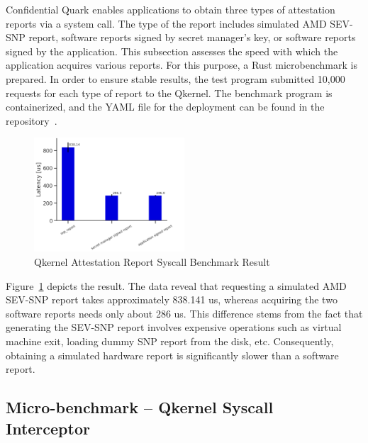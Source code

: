Confidential Quark enables applications to obtain three types of attestation reports via a system call. The type of the report includes simulated AMD SEV-SNP report, software reports signed by secret manager's key, or software reports signed by the application. This subsection assesses the speed with which the 
application acquires various reports. For this purpose, a Rust microbenchmark\cite*{benchamark_Attestation_Report_Syscall} is prepared. In order to ensure stable results, the test program submitted 10,000 requests for each type of report to the Qkernel. The benchmark program is containerized, 
and the YAML file for the deployment can be found in the repository~\cite*{perf_test_repo}.

\begin{figure}[!htb]
    \centering
    \includegraphics[width=0.5\textwidth]{images/perf_attestation_report_result.PNG}
    \caption[Benchmark result of Attestation Report Syscall]{Qkernel Attestation Report Syscall Benchmark Result}
    \label{fig:perf_attestation_report_result}
\end{figure}

Figure~\ref{fig:perf_attestation_report_result} depicts the result. The data reveal that requesting a simulated AMD SEV-SNP report takes approximately 838.141 us, whereas acquiring the two software reports needs only about 286 us. This difference stems from the fact that generating the SEV-SNP report involves expensive operations 
such as virtual machine exit, loading dummy SNP report from the disk, etc. Consequently, obtaining a simulated hardware report is significantly slower than a software report.


\subsection{Micro-benchmark – Qkernel Syscall Interceptor}
\label{bench_Interceptor}


